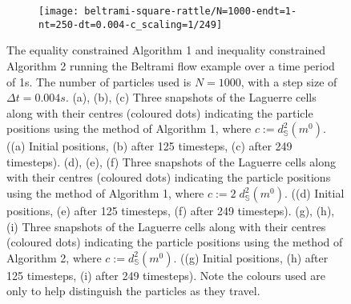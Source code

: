 \documentclass[11pt, oneside]{article}   	%
\newcommand{\dt}{\Delta t}
\newcommand{\Sb}{\mathbb{S}}
\begin{document}
\begin{figure}[H]
   \begin{subfigure}[t]{0.25\textwidth}
        \centering
	\texttt{[image: beltrami-square-rattle/N=1000-endt=1-nt=250-dt=0.004-c\_scaling=1/249]}
        \caption{} \label{fig:beltrami-flow-249-i}
    \end{subfigure}
\centering
\caption{The equality constrained Algorithm 1 and inequality constrained Algorithm 2 running the Beltrami flow example over a time period of 1s. The number of particles used is \(N = 1000\), with a step size of \(\dt = 0.004s\). (a), (b), (c) Three snapshots of the Laguerre cells along with their centres (coloured dots) indicating the particle positions using the method of Algorithm 1, where \(c := d^2_\Sb (m^0)\). ((a) Initial positions, (b) after 125 timesteps, (c) after 249 timesteps). (d), (e), (f) Three snapshots of the Laguerre cells along with their centres (coloured dots) indicating the particle positions using the method of Algorithm 1, where \(c := 2 \; d^2_\Sb (m^0)\). ((d) Initial positions, (e) after 125 timesteps, (f) after 249 timesteps). (g), (h), (i) Three snapshots of the Laguerre cells along with their centres (coloured dots) indicating the particle positions using the method of Algorithm 2, where \(c := d^2_\Sb (m^0)\). ((g) Initial positions, (h) after 125 timesteps, (i) after 249 timesteps). Note the colours used are only to help distinguish the particles as they travel.}
\centering
\label{fig:beltrami-flow}
\end{figure}
\end{document}
